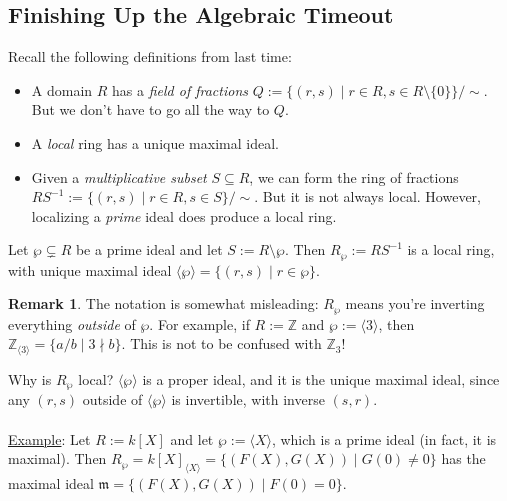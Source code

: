 \documentclass[12pt]{article}
\newcommand{\z}{\mathbb{Z}}
\newcommand{\ita}[1]{\textit{#1}}
\newcommand{\vbrack}[1]{\langle #1\rangle}
\theoremstyle{definition}
\newtheorem*{remark}{Remark}
\begin{document}
\subsection{Finishing Up the Algebraic Timeout}
Recall the following definitions from last time:
\begin{itemize}
    \item A domain $R$ has a \ita{field of fractions} $Q:=\{(r,s)\mid r\in R,s\in R\setminus\{0\}\}/\sim$. But we don't have to go all the way to $Q$.
    \item A \ita{local} ring has a unique maximal ideal.
    \item Given a \ita{multiplicative subset} $S\subseteq R$, we can form the ring of fractions $RS^{-1}:=\{(r,s)\mid r\in R,s\in S\}/\sim$. But it is not always local. However, localizing a \ita{prime} ideal does produce a local ring.
\end{itemize}
Let $\wp\subsetneq R$ be a prime ideal and let $S:=R\setminus\wp$. Then $R_{\wp}:=RS^{-1}$ is a local ring, with unique maximal ideal $\vbrack{\wp}=\{(r,s)\mid r\in\wp\}$.
\begin{remark}
   The notation is somewhat misleading: $R_{\wp}$ means you're inverting everything \ita{outside} of $\wp$. For example, if $R:=\z$ and $\wp:=\vbrack{3}$, then $\z_{\vbrack{3}}=\{a/b\mid 3\nmid b\}$. This is not to be confused with $\z_3$!
\end{remark}
Why is $R_{\wp}$ local? $\vbrack{\wp}$ is a proper ideal, and it is the unique maximal ideal, since any $(r,s)$ outside of $\vbrack{\wp}$ is invertible, with inverse $(s,r)$. \\\\
\underline{Example}: Let $R:=k[X]$ and let $\wp:=\vbrack{X}$, which is a prime ideal (in fact, it is maximal). Then $R_{\wp}=k[X]_{\vbrack{X}}=\{(F(X),G(X))\mid G(0)\neq0\}$ has the maximal ideal $\mathfrak{m}=\{(F(X),G(X))\mid F(0)=0\}$.
\end{document}
